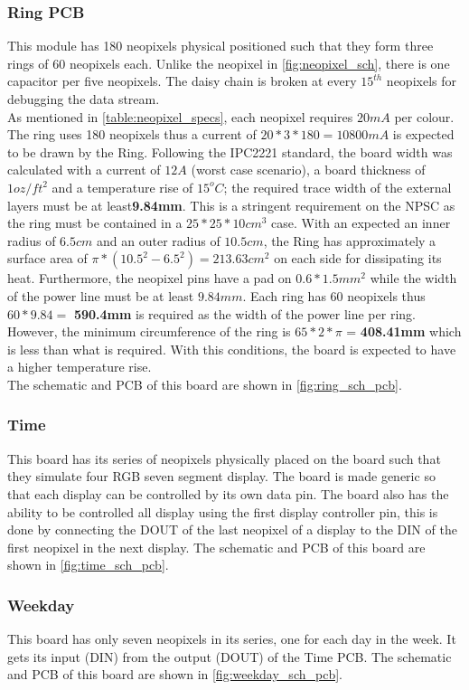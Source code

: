 \subsubsection{Ring PCB}
This module has 180 neopixels physical positioned such that they form three rings of 60 neopixels each. Unlike the neopixel in \cref{fig:neopixel_sch}, there is one capacitor per five neopixels. The daisy chain is broken at every $15^{th}$ neopixels for debugging the data stream. \\
As mentioned in \cref{table:neopixel_specs}, each neopixel requires $20mA$ per colour. The ring uses 180 neopixels thus a current of $20*3*180 = 10800 mA$ is expected to be drawn by the Ring. Following the IPC2221 standard, the board width was calculated with a current of $12A$ (worst case scenario), a board thickness of $1oz/ft^2$ and a temperature rise of $15^oC$; the required trace width of the external layers must be at least\textbf{9.84mm}. This is a stringent requirement on the NPSC as the ring must be contained in a $25*25*10cm^3$ case. With an expected an inner radius of $6.5cm$ and an outer radius of $10.5cm$, the Ring has approximately a surface area of $ \pi*(10.5^2-6.5^2) = 213.63 cm^2$ on each side for dissipating its heat. Furthermore, the neopixel pins have a pad on $0.6*1.5 mm^2$ while the width of the power line must be at least $9.84mm$. Each ring has 60 neopixels thus $60*9.84=$ \textbf{590.4mm} is required as the width of the power line per ring. However, the minimum circumference of the ring is $65*2*\pi$ = \textbf{408.41mm} which is less than what is required. With this conditions, the board is expected to have a higher temperature rise.\\
The schematic and PCB of this board are shown in \cref{fig:ring_sch_pcb}.

\subsubsection{Time}
This board has its series of neopixels physically placed on the board such that they simulate four RGB seven segment display. The board is made generic so that each display can be controlled by its own data pin. The board also has the ability to be controlled all display using the first display controller pin, this is done by connecting the DOUT of the last neopixel of a display to the DIN of the first neopixel in the next display.
The schematic and PCB of this board are shown in \cref{fig:time_sch_pcb}.

\subsubsection{Weekday}
This board has only seven neopixels in its series, one for each day in the week. It gets its input (DIN) from the output (DOUT) of the Time PCB.
The schematic and PCB of this board are shown in \cref{fig:weekday_sch_pcb}.

